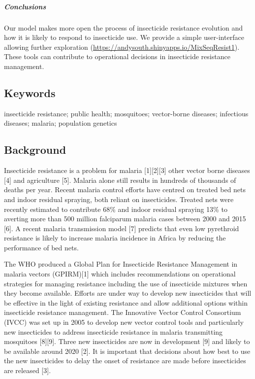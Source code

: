 \documentclass[11pt,]{article}
\let\oldsubparagraph\subparagraph
\renewcommand{\subparagraph}[1]{\oldsubparagraph{#1}\mbox{}}
\begin{document}
\subparagraph{Conclusions}\label{conclusions}

Our model makes more open the process of insecticide resistance
evolution and how it is likely to respond to insecticide use. We provide
a simple user-interface allowing further exploration
(\url{https://andysouth.shinyapps.io/MixSeqResist1}). These tools can
contribute to operational decisions in insecticide resistance
management.

\subsection{Keywords}\label{keywords}

insecticide resistance; public health; mosquitoes; vector-borne
diseases; infectious diseases; malaria; population genetics

\subsection{Background}\label{background-1}

Insecticide resistance is a problem for malaria {[}1{]}{[}2{]}{[}3{]}
other vector borne diseases {[}4{]} and agriculture {[}5{]}. Malaria
alone still results in hundreds of thousands of deaths per year. Recent
malaria control efforts have centred on treated bed nets and indoor
residual spraying, both reliant on insecticides. Treated nets were
recently estimated to contribute 68\% and indoor residual spraying 13\%
to averting more than 500 million falciparum malaria cases between 2000
and 2015 {[}6{]}. A recent malaria transmission model {[}7{]} predicts
that even low pyrethroid resistance is likely to increase malaria
incidence in Africa by reducing the performance of bed nets.

The WHO produced a Global Plan for Insecticide Resistance Management in
malaria vectors (GPIRM){[}1{]} which includes recommendations on
operational strategies for managing resistance including the use of
insecticide mixtures when they become available. Efforts are under way
to develop new insecticides that will be effective in the light of
existing resistance and allow additional options within insecticide
resistance management. The Innovative Vector Control Consortium (IVCC)
was set up in 2005 to develop new vector control tools and particularly
new insecticides to address insecticide resistance in malaria
transmitting mosquitoes {[}8{]}{[}9{]}. Three new insecticides are now
in development {[}9{]} and likely to be available around 2020 {[}2{]}.
It is important that decisions about how best to use the new
insecticides to delay the onset of resistance are made before
insecticides are released {[}3{]}.
\end{document}
